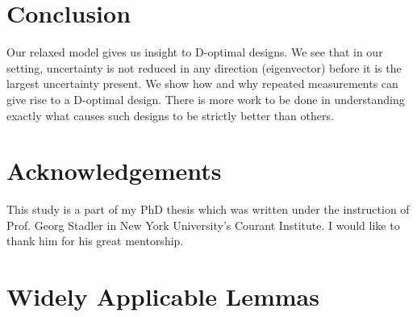 \documentclass{amsart}
\numberwithin{equation}{section}
\begin{document}
\section{Conclusion}\label{section:conclusion}
Our relaxed model gives us insight to D-optimal designs. We see that
in our setting, uncertainty is not reduced in any direction
(eigenvector) before it is the largest uncertainty present. We show
how and why repeated measurements can give rise to a D-optimal
design. There is more work to be done in understanding exactly what
causes such designs to be strictly better than others.


\section{Acknowledgements}
This study is a part of my PhD thesis \cite{mine} which was written
under the instruction of Prof. Georg Stadler in New York University's
Courant Institute. I would like to thank him for his great mentorship.

\appendix
\section{Widely Applicable Lemmas}
\end{document}
